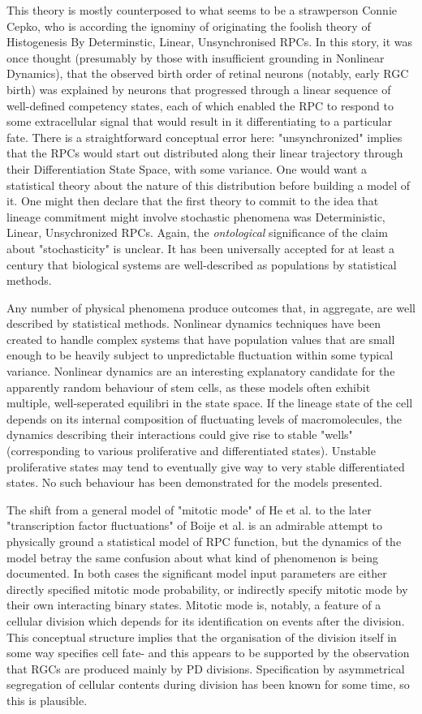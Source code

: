 This theory is mostly counterposed to what seems to be a strawperson Connie Cepko, who is according the ignominy of originating the foolish theory of Histogenesis By Determinstic, Linear, Unsynchronised RPCs. In this story, it was once thought (presumably by those with insufficient grounding in Nonlinear Dynamics), that the observed birth order of retinal neurons (notably, early RGC birth) was explained by neurons that progressed through a linear sequence of well-defined competency states, each of which enabled the RPC to respond to some extracellular signal that would result in it differentiating to a particular fate. There is a straightforward conceptual error here: "unsynchronized" implies that the RPCs would start out distributed along their linear trajectory through their Differentiation State Space, with some variance. One would want a statistical theory about the nature of this distribution before building a model of it. One might then declare that the first theory to commit to the idea that lineage commitment might involve stochastic phenomena was Deterministic, Linear, Unsychronized RPCs. Again, the \textit{ontological} significance of the claim about "stochasticity" is unclear. It has been universally accepted for at least a century that biological systems are well-described as populations by statistical methods.

Any number of physical phenomena produce outcomes that, in aggregate, are well described by statistical methods. Nonlinear dynamics techniques have been created to handle complex systems that have population values that are small enough to be heavily subject to unpredictable fluctuation within some typical variance. Nonlinear dynamics are an interesting explanatory candidate for the apparently random behaviour of stem cells, as these models often exhibit multiple, well-seperated equilibri in the state space. If the lineage state of the cell depends on its internal composition of fluctuating levels of macromolecules, the dynamics describing their interactions could give rise to stable "wells" (corresponding to various proliferative and differentiated states). Unstable proliferative states may tend to eventually give way to very stable differentiated states. No such behaviour has been demonstrated for the models presented.

The shift from a general model of "mitotic mode" of He et al. to the later "transcription factor fluctuations" of Boije et al. is an admirable attempt to physically ground a statistical model of RPC function, but the dynamics of the model betray the same confusion about what kind of phenomenon is being documented. In both cases the significant model input parameters are either directly specified mitotic mode probability, or indirectly specify mitotic mode by their own interacting binary states. Mitotic mode is, notably, a feature of a cellular division which depends for its identification on events after the division. This conceptual structure implies that the organisation of the division itself in some way specifies cell fate- and this appears to be supported by the observation that RGCs are produced mainly by PD divisions. Specification by asymmetrical segregation of cellular contents during division has been known for some time, so this is plausible.

